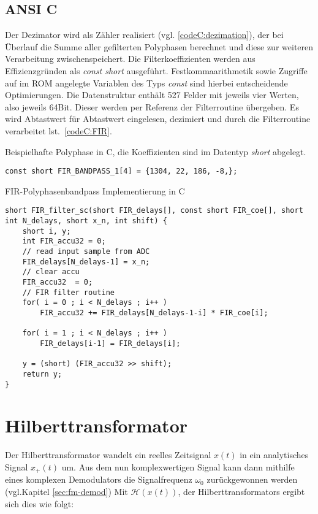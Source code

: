 \documentclass{article}
\begin{document}
\subsection{ANSI C}
Der Dezimator wird als Zähler realisiert (vgl. \ref{codeC:dezimation}), der bei Überlauf die Summe aller gefilterten Polyphasen berechnet und diese zur weiteren Verarbeitung zwischenspeichert. Die Filterkoeffizienten werden aus Effizienzgründen als \textit{const short} ausgeführt. Festkommaarithmetik sowie Zugriffe auf im ROM angelegte Variablen des Typs \textit{const} sind hierbei entscheidende Optimierungen.
Die Datenstruktur enthält 527 Felder mit jeweils vier Werten, also jeweils 64Bit. Dieser werden per Referenz der Filterroutine übergeben. Es wird Abtastwert für Abtastwert eingelesen, dezimiert und durch die Filterroutine verarbeitet lst.~\ref{codeC:FIR}.
\begin{listing}\label{codeC:dezimation}
    \caption{Beispielhafte Polyphase in C, die Koeffizienten sind im Datentyp \textit{short} abgelegt.}
    \begin{verbatim}
const short FIR_BANDPASS_1[4] = {1304, 22, 186, -8,};
    \end{verbatim}
\end{listing}
\begin{listing}\label{codeC:FIR}
    \caption{FIR-Polyphasenbandpass Implementierung in C}
    \begin{verbatim}
short FIR_filter_sc(short FIR_delays[], const short FIR_coe[], short int N_delays, short x_n, int shift) {
    short i, y;
    int FIR_accu32 = 0;
    // read input sample from ADC
    FIR_delays[N_delays-1] = x_n;	 
    // clear accu
    FIR_accu32	= 0;
    // FIR filter routine				
    for( i = 0 ; i < N_delays ; i++ )		
        FIR_accu32 += FIR_delays[N_delays-1-i] * FIR_coe[i];
    
    for( i = 1 ; i < N_delays ; i++ )				
        FIR_delays[i-1] = FIR_delays[i];

    y = (short) (FIR_accu32 >> shift);
    return y;
}
    \end{verbatim}
\end{listing}

\section{Hilberttransformator}\label{sec:hilbert}
Der Hilberttransformator wandelt ein reelles Zeitsignal $x(t)$ in ein analytisches Signal $x_+(t)$ um.
Aus dem nun komplexwertigen Signal kann dann mithilfe eines komplexen Demodulators die Signalfrequenz $\omega_0$ zurückgewonnen werden (vgl.Kapitel \ref{sec:fm-demod})
Mit $\mathcal{H}(x(t))$, der Hilberttransformators ergibt sich dies wie folgt:
\end{document}
